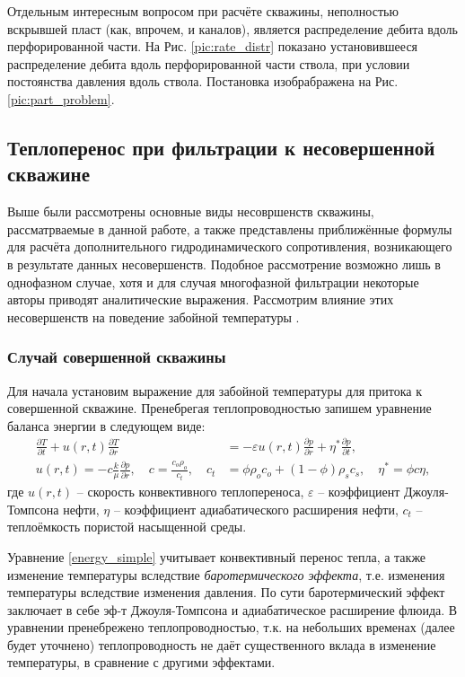 	Отдельным интересным вопросом при расчёте скважины, неполностью вскрывшей пласт (как, впрочем, и каналов), является распределение дебита вдоль перфорированной части. На Рис. \ref{pic:rate_distr} показано установившееся распределение дебита вдоль перфорированной части ствола, при условии постоянства давления вдоль ствола.
Постановка изобрабражена на Рис. \ref{pic:part_problem}.

\subsection{Теплоперенос при фильтрации к несовершенной скважине}
	Выше были рассмотрены основные виды несовршенств скважины, рассматрваемые в данной работе, а также представлены приближённые формулы для расчёта дополнительного гидродинамического сопротивления, возникающего в результате данных несовершенств.
	Подобное рассмотрение возможно лишь в однофазном случае, хотя и для случая многофазной фильтрации некоторые авторы приводят аналитические выражения.
	Рассмотрим влияние этих несовершенств на поведение забойной температуры \cite{ramazanov_spe}.

\subsubsection{Случай совершенной скважины}
	Для начала установим выражение для забойной температуры для притока к совершенной скважине.
	Пренебрегая теплопроводностью запишем уравнение баланса энергии в следующем виде:
\begin{align}
	\label{energy_simple}
	\frac{\partial{T}}{\partial{t}}+u(r, t)\frac{\partial{T}}{\partial{r}} &= -\varepsilon u(r, t)\frac{\partial p}{\partial{r}}
	+\eta^{\ast}\frac{\partial{p}}{\partial{t}}, \\
	u(r, t) = -c\frac{k}{\mu}\frac{\partial{p}}{\partial{r}}, \quad c = \frac{c_o \rho_o}{c_t},  \quad
	c_t &= \phi \rho_o c_o + (1-\phi)\rho_{s}c_s, \quad \eta^{\ast} = \phi c \eta,
\end{align}
	где $u(r, t)$ -- скорость конвективного теплопереноса,
	$\varepsilon$ -- коэффициент Джоуля-Томпсона нефти,
	$\eta$ -- коэффициент адиабатического расширения нефти,
	$c_t$ -- теплоёмкость пористой насыщенной среды.
	
	Уравнение \eqref{energy_simple} учитывает конвективный перенос тепла, а также изменение температуры вследствие 
	\textit{баротермического эффекта}, т.е. изменения температуры вследствие изменения давления.
	По сути баротермический эффект заключает в себе эф-т Джоуля-Томпсона и адиабатическое расширение флюида.
	В уравнении пренебрежено теплопроводностью, т.к. на небольших временах (далее будет уточнено) теплопроводность не даёт существенного вклада в изменение температуры, в сравнение с другими эффектами.

